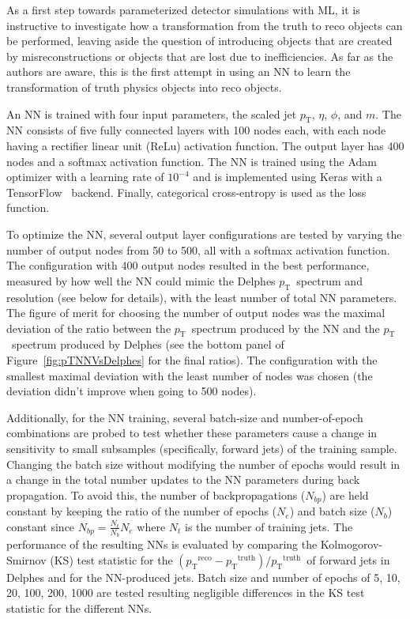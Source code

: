 \documentclass[showpacs,showkeys,preprint,prd,nofootinbib,linenumbers,12pt,superscriptaddress]{revtex4-1}
\def\pt{\ensuremath{p_{\mathrm{T}}}}
\def\ptRes{\ensuremath{(\pt^{\mathrm{reco}}-\pt^{\mathrm{truth}})/\pt^{\mathrm{truth}}}}
\begin{document}
As a first step towards parameterized detector simulations with ML, it is instructive to investigate how a transformation from the truth to reco objects can be performed, leaving aside the question of introducing objects that are created by misreconstructions or objects that are lost due to inefficiencies. As far as the authors are aware, this is the first attempt in using an NN to learn the transformation of truth physics objects into reco objects.

An NN is trained with four input parameters, the scaled jet \pt, $\eta$, $\phi$, and $m$. The NN consists of five fully connected layers with 100 nodes each, with each node having a rectifier linear unit (ReLu) activation function. The output layer has 400 nodes and a softmax activation function. The NN is trained using the Adam~\cite{adam} optimizer with a learning rate of $10^{-4}$ and is implemented using Keras with a TensorFlow~\cite{tensorflow2015-whitepaper} backend. Finally, categorical cross-entropy is used as the loss function.

To optimize the NN, several output layer configurations are tested by varying the number of output nodes from 50 to 500, all with a softmax activation function. The configuration with 400 output nodes resulted in the best performance, measured by how well the NN could mimic the Delphes \pt\ spectrum and resolution (see below for details), with the least number of total NN parameters. The figure of merit for choosing the number of output nodes was the maximal deviation of the ratio between the \pt\ spectrum produced by the NN and the \pt\ spectrum produced by Delphes (see the bottom panel of Figure~\ref{fig:pTNNVsDelphes} for the final ratios). The configuration with the smallest maximal deviation with the least number of nodes was chosen (the deviation didn't improve when going to 500 nodes).

Additionally, for the NN training, several batch-size and number-of-epoch combinations are probed to test whether these parameters cause a change in sensitivity to small subsamples (specifically, forward jets) of the training sample. Changing the batch size without modifying the number of epochs would result in a change in the total number updates to the NN parameters during back propagation. To avoid this, the number of backpropagations ($N_{bp}$) are held constant by keeping the ratio of the number of epochs ($N_e$) and batch size ($N_b$) constant since $N_{bp}=\frac{N_t}{N_b}N_e$ where $N_t$ is the number of training jets. The performance of the resulting NNs is evaluated by comparing the Kolmogorov-Smirnov (KS) test statistic for the \ptRes\ of forward jets in Delphes and for the NN-produced jets. Batch size and number of epochs of 5, 10, 20, 100, 200, 1000 are tested resulting negligible differences in the KS test statistic for the different NNs.
\end{document}
